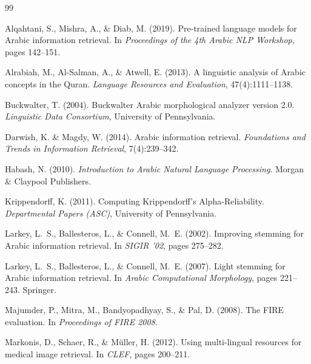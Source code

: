 \documentclass[preprint,12pt,numbers]{elsarticle}
\begin{document}
\begin{thebibliography}{99}

Alqahtani, S., Mishra, A., \& Diab, M. (2019).
\newblock Pre-trained language models for Arabic information retrieval.
\newblock In \textit{Proceedings of the 4th Arabic NLP Workshop}, pages 142--151.

Alrabiah, M., Al-Salman, A., \& Atwell, E. (2013).
\newblock A linguistic analysis of Arabic concepts in the Quran.
\newblock \textit{Language Resources and Evaluation}, 47(4):1111--1138.

Buckwalter, T. (2004).
\newblock Buckwalter Arabic morphological analyzer version 2.0.
\newblock \textit{Linguistic Data Consortium}, University of Pennsylvania.

Darwish, K. \& Magdy, W. (2014).
\newblock Arabic information retrieval.
\newblock \textit{Foundations and Trends in Information Retrieval}, 7(4):239--342.

Habash, N. (2010).
\newblock \textit{Introduction to Arabic Natural Language Processing}.
\newblock Morgan \& Claypool Publishers.

Krippendorff, K. (2011).
\newblock Computing Krippendorff's Alpha-Reliability.
\newblock \textit{Departmental Papers (ASC)}, University of Pennsylvania.

Larkey, L.~S., Ballesteros, L., \& Connell, M.~E. (2002).
\newblock Improving stemming for Arabic information retrieval.
\newblock In \textit{SIGIR '02}, pages 275--282.

Larkey, L.~S., Ballesteros, L., \& Connell, M.~E. (2007).
\newblock Light stemming for Arabic information retrieval.
\newblock In \textit{Arabic Computational Morphology}, pages 221--243. Springer.

Majumder, P., Mitra, M., Bandyopadhyay, S., \& Pal, D. (2008).
\newblock The FIRE evaluation.
\newblock In \textit{Proceedings of FIRE 2008}.

Markonis, D., Schaer, R., \& M{\"u}ller, H. (2012).
\newblock Using multi-lingual resources for medical image retrieval.
\newblock In \textit{CLEF}, pages 200--211.


\end{thebibliography}
\end{document}
